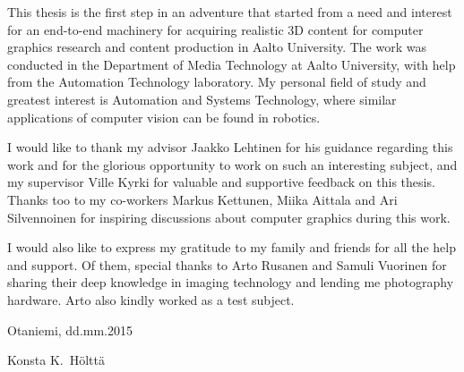 This thesis is the first step in an adventure that started from a need and interest for an end-to-end machinery for acquiring realistic 3D content for computer graphics research and content production in Aalto University.
The work was conducted in the Department of Media Technology at Aalto University, with help from the Automation Technology laboratory.
My personal field of study and greatest interest is Automation and Systems Technology, where similar applications of computer vision can be found in robotics.

I would like to thank my advisor Jaakko Lehtinen for his guidance regarding this work and for the glorious opportunity to work on such an interesting subject, and my supervisor Ville Kyrki for valuable and supportive feedback on this thesis.
Thanks too to my co-workers Markus Kettunen, Miika Aittala and Ari Silvennoinen for inspiring discussions about computer graphics during this work.

I would also like to express my gratitude to my family and friends for all the help and support.
Of them, special thanks to Arto Rusanen and Samuli Vuorinen for sharing their deep knowledge in imaging technology and lending me photography hardware. Arto also kindly worked as a test subject.


\vspace{5cm}
Otaniemi, dd.mm.2015

\vspace{5mm}
{\hfill Konsta K.\ Hölttä \hspace{1cm}}
